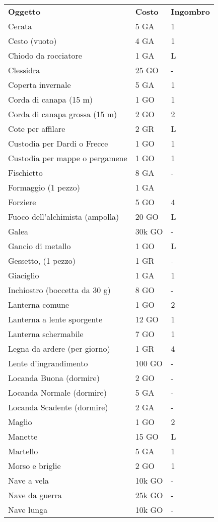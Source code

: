 \documentclass[12pt,a4paper,twoside,openany]{book}
\begin{document}
\begin{multicols}{2}
{\begin{tabularx}{0.42\textwidth}{lll}
\textbf{Oggetto}    & \textbf{Costo} & \textbf{Ingombro}\\
Cerata&5 GA&1\\
Cesto (vuoto) & 4 GA& 1 \\
Chiodo da rocciatore& 1 GA&L\\
Clessidra& 25 GO  & -\\
Coperta invernale & 5 GA& 1 \\
Corda di canapa (15 m)& 1 GO& 1\\
Corda di canapa grossa (15 m)& 2 GO& 2 \\
Cote per affilare & 2 GR& L \\
Custodia per Dardi o Frecce  & 1 GO& 1 \\
Custodia per mappe o pergamene  & 1 GO& 1 \\
Fischietto  & 8 GA& - \\
Formaggio (1 pezzo)& 1 GA& \\
Forziere & 5 GO&4\\
Fuoco dell'alchimista (ampolla)& 20 GO& L\\
Galea & 30k GO  & -\\
Gancio di metallo & 1 GO& L\\
Gessetto, (1 pezzo) & 1 GR& -  \\
Giaciglio& 1 GA& 1 \\
Inchiostro (boccetta da 30 g)& 8 GO& - \\
Lanterna comune& 1 GO& 2 \\
Lanterna a lente sporgente  & 12 GO  & 1 \\
Lanterna schermabile& 7 GO& 1 \\
Legna da ardere (per giorno)& 1 GR& 4 \\
Lente d'ingrandimento & 100 GO & -\\
Locanda Buona (dormire) & 2 GO& -\\
Locanda Normale (dormire)& 5 GA& -\\
Locanda Scadente (dormire) & 2 GA& -\\
Maglio& 1 GO& 2 \\
Manette & 15 GO  & L \\
Martello& 5 GA& 1  \\
Morso e briglie & 2 GO&1\\
Nave a vela & 10k GO & -\\
Nave da guerra  & 25k GO  & -\\
Nave lunga  & 10k GO & -\\

\end{tabularx}}
\end{multicols}
\end{document}
